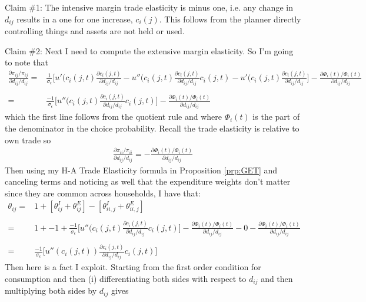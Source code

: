 \documentclass[12pt,pdftex]{article}
\begin{document}
\begin{onehalfspacing}
Claim \#1: The intensive margin trade elasticity is minus one, i.e. any change in $d_{ij}$ results in a one for one increase, $c_{i}(j)$. This follows from the planner directly controlling things and assets are not held or used.

Claim \#2: Next I need to compute the extensive margin elasticity. So I'm going to note that
\begin{align}
\frac{\partial \pi_{ij} / \pi_{ij}}{\partial d_{ij} / d_{ij}} =& \frac{1}{\sigma_{\epsilon}} \bigg [ u'(c_{i}(j,t)\frac{\partial c_{i}(j,t)}{\partial d_{ij}/ d_{ij}} - u''(c_{i}(j,t)\frac{\partial c_{i}(j,t)}{\partial d_{ij}/ d_{ij}}c_{i}(j,t) - u'(c_{i}(j,t)\frac{\partial c_{i}(j,t)}{\partial d_{ij}/ d_{ij}} \bigg] - \frac{\partial \Phi_{i}(t) /\Phi_i(t)}{\partial d_{ij}/ d_{ij}} \\
\nonumber \\
=& \frac{-1}{\sigma_{\epsilon}} \bigg [ u''(c_{i}(j,t)\frac{\partial c_{i}(j,t)}{\partial d_{ij}/ d_{ij}}c_{i}(j,t) \bigg] - \frac{\partial \Phi_{i}(t) /\Phi_i(t)}{\partial d_{ij}/ d_{ij}}
\end{align}
which the first line follows from the quotient rule and where $\Phi_{i}(t)$ is the part of the denominator in the choice probability. Recall the trade elasticity is relative to own trade so
\begin{align}
\frac{\partial \pi_{ii} / \pi_{ii}}{\partial d_{ij} / d_{ij}} = - \frac{\partial \Phi_{i}(t) /\Phi_i(t)}{\partial d_{ij}/ d_{ij}}
\end{align}
Then using my H-A Trade Elasticity formula in Proposition \ref{prp:GET} and canceling terms and noticing as well that the expenditure weights don't matter since they are common across households, I have that:
\begin{align}
\theta_{ij} =& 1 + \left [\theta_{ij}^{I} + \theta_{ij}^{E} \right ]  - \left [ \theta_{ii,j}^{I} + \theta_{ii,j}^{E} \right ]  \\
\nonumber \\
= & 1 + -1 + \frac{-1}{\sigma_{\epsilon}} \bigg [ u''(c_{i}(j,t)\frac{\partial c_{i}(j,t)}{\partial d_{ij}/ d_{ij}}c_{i}(j,t) \bigg] - \frac{\partial \Phi_{i}(t) /\Phi_i(t)}{\partial d_{ij}/ d_{ij}} - 0  - \frac{\partial \Phi_{i}(t) /\Phi_i(t)}{\partial d_{ij}/ d_{ij}} \\
\nonumber \\
= & \frac{-1}{\sigma_{\epsilon}} \bigg [ u''(c_{i}(j,t))\frac{\partial c_{i}(j,t)}{\partial d_{ij}/ d_{ij}}c_{i}(j,t) \bigg]
\end{align}
Then here is a fact I exploit. Starting from the first order condition for consumption and then (i) differentiating both sides with respect to $d_{ij}$ and then multiplying both sides by $d_{ij}$ gives

\end{onehalfspacing}
\end{document}
